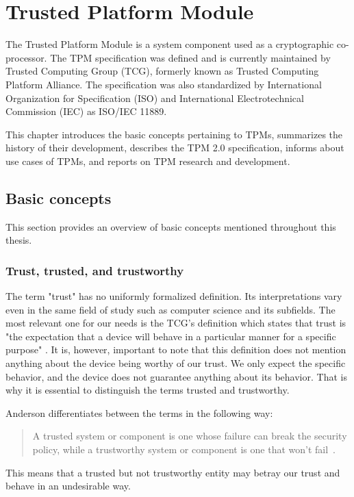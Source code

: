 \chapter{Trusted Platform Module}
The Trusted Platform Module is a system component used as a cryptographic co-processor. The TPM specification was defined and is currently maintained by Trusted Computing Group (TCG), formerly known as Trusted Computing Platform Alliance. The specification was also standardized by International Organization for Specification (ISO) and International Electrotechnical Commission (IEC) as ISO/IEC 11889.

This chapter introduces the basic concepts pertaining to TPMs, summarizes the history of their development, describes the TPM 2.0 specification, informs about use cases of TPMs, and reports on TPM research and development.

\section{Basic concepts}
This section provides an overview of basic concepts mentioned throughout this thesis. 

\subsection{Trust, trusted, and trustworthy}\label{sec:trust-def}
The term "trust" has no uniformly formalized definition. Its interpretations vary even in the same field of study such as computer science and its subfields. The most relevant one for our needs is the TCG's definition which states that trust is "the expectation that a device will behave in a particular manner for a specific purpose" \cite{tcg_arch_overview}. It is, however, important to note that this definition does not mention anything about the device being worthy of our trust. We only expect the specific behavior, and the device does not guarantee anything about its behavior. That is why it is essential to distinguish the terms trusted and trustworthy. 

Anderson differentiates between the terms in the following way:
\begin{quote}
A trusted system or component is one whose failure can break the security policy, while a trustworthy system or component is one that won’t fail~\cite{andersonSecEng}.
\end{quote}

This means that a trusted but not trustworthy entity may betray our trust and behave in an undesirable way.

